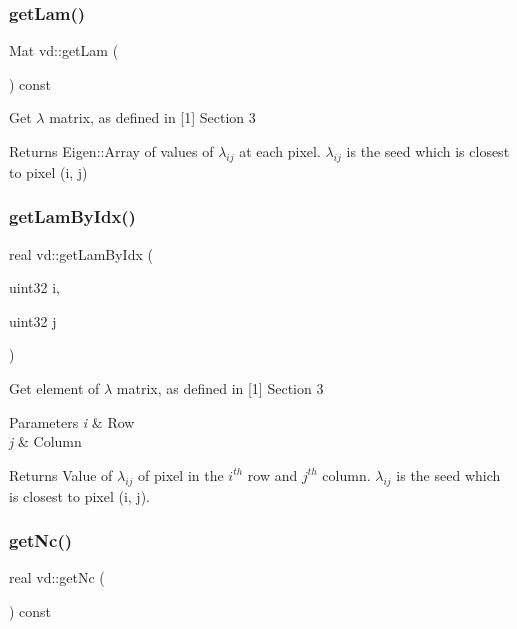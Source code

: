 \subsubsection{\texorpdfstring{get\+Lam()}{getLam()}}
{\footnotesize\ttfamily Mat vd\+::get\+Lam (\begin{DoxyParamCaption}{ }\end{DoxyParamCaption}) const}

Get $\lambda$ matrix, as defined in \mbox{[}1\mbox{]} Section 3 \begin{DoxyReturn}{Returns}
Eigen\+::\+Array of values of $\lambda_{ij}$ at each pixel. $\lambda_{ij}$ is the seed which is closest to pixel (i, j) 
\end{DoxyReturn}
\mbox{\label{classvd_ae0ec132e647b7d9662bf2bfbf95e7297}} 
\subsubsection{\texorpdfstring{get\+Lam\+By\+Idx()}{getLamByIdx()}}
{\footnotesize\ttfamily real vd\+::get\+Lam\+By\+Idx (\begin{DoxyParamCaption}\item[{uint32}]{i,  }\item[{uint32}]{j }\end{DoxyParamCaption})}

Get element of $\lambda$ matrix, as defined in \mbox{[}1\mbox{]} Section 3 
\begin{DoxyParams}{Parameters}
{\em i} & Row \\
\hline
{\em j} & Column \\
\hline
\end{DoxyParams}
\begin{DoxyReturn}{Returns}
Value of $\lambda_{ij}$ of pixel in the $ i^{th} $ row and $ j^{th} $ column. $\lambda_{ij}$ is the seed which is closest to pixel (i, j). 
\end{DoxyReturn}
\mbox{\label{classvd_ab0de0a5b8929ed7a7bb6ca902a462dd4}} 
\subsubsection{\texorpdfstring{get\+Nc()}{getNc()}}
{\footnotesize\ttfamily real vd\+::get\+Nc (\begin{DoxyParamCaption}{ }\end{DoxyParamCaption}) const}

